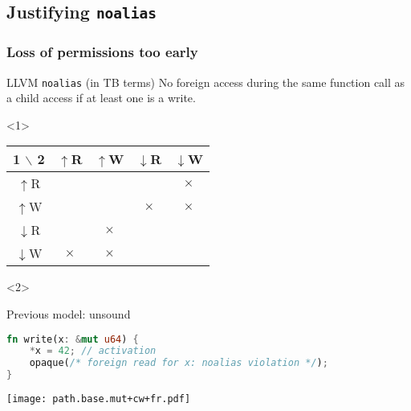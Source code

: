 \subsection{Justifying \texttt{noalias}}

\begin{frame}[fragile, t]
    \frametitle{Loss of permissions too early}
    \begin{alertblock}{LLVM \texttt{noalias} (in TB terms)}
        No foreign access during the same function call as a child access
        if at least one is a write.
    \end{alertblock}
    
    \begin{onlyenv}<1>
        \begin{center}
        \begin{tabular}{|c|c|c|c|c|}
            \hline
            1 \(\backslash\) 2 & \(\uparrow\)R & \(\uparrow\)W & \(\downarrow\)R & \(\downarrow\)W \\
            \hline
            \(\uparrow\)R &  &  &  & \(\times\) \\
            \hline
            \(\uparrow\)W &  &  & \(\times\) & \(\times\) \\
            \hline
            \(\downarrow\)R &  & \(\times\) &  &  \\
            \hline
            \(\downarrow\)W & \(\times\) & \(\times\) &  &  \\
            \hline
        \end{tabular}
        \end{center}
    \end{onlyenv}

    \begin{onlyenv}<2>
        \begin{block}{Previous model: unsound}
            \begin{lstlisting}[language=rust, escapechar=@]
fn write(x: &mut u64) {
    *x = 42; // activation
    opaque(/* foreign read for x: noalias violation */);
}
            \end{lstlisting}
        \end{block}
        \texttt{[image: path.base.mut+cw+fr.pdf]}
    \end{onlyenv}
\end{frame}

